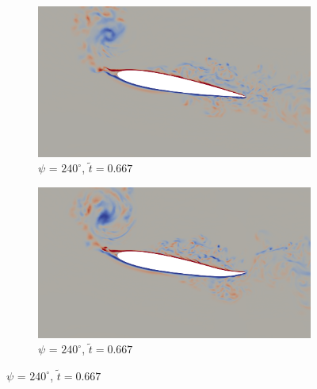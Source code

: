 \begin{figure}[H]
	\centering
	

	
	
	
	\begin{subfigure}[b]{0.4\textwidth}
		\centering
		\includegraphics[width=1\textwidth]{figures/zonal_adapt_results/AC/mu_1pt5/baseline/phase_240.png}
		\caption{ $\psi$ = $240^\circ$, $\tilde{t}=0.667$}
		\label{fig:mu_1pt5_baseline_psi240}
	\end{subfigure}
	\begin{subfigure}[b]{0.4\textwidth}
		\centering
		\includegraphics[width=1\textwidth]{figures/zonal_adapt_results/AC/mu_1pt5/AC/phase_240.png}
		\caption{ $\psi$ = $240^\circ$, $\tilde{t}=0.667$}
		\label{fig:mu_1pt5_AC_psi240}
	\end{subfigure}
	

\end{figure}
